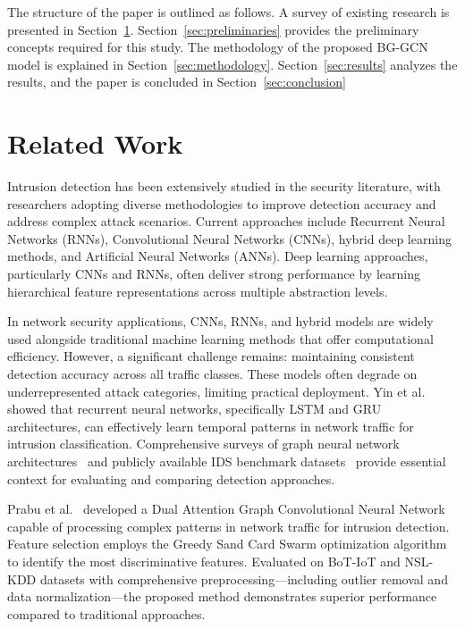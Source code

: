 \documentclass[a4paper,fleqn]{cas-sc}
\begin{document}
The structure of the paper is outlined as follows. A survey of existing research is presented in  Section~\ref{sec2}. Section~\ref{sec:preliminaries} provides the preliminary concepts required for this study. The methodology of the proposed BG-GCN model is explained in Section~\ref{sec:methodology}. Section~\ref{sec:results}  analyzes the results, and the paper is concluded in  Section~\ref{sec:conclusion} 



\section{Related Work}\label{sec2}


Intrusion detection has been extensively studied in the security literature, with researchers adopting diverse methodologies to improve detection accuracy and address complex attack scenarios. Current approaches include Recurrent Neural Networks (RNNs), Convolutional Neural Networks (CNNs), hybrid deep learning methods, and Artificial Neural Networks (ANNs). Deep learning approaches, particularly CNNs and RNNs, often deliver strong performance by learning hierarchical feature representations across multiple abstraction levels.

In network security applications, CNNs, RNNs, and hybrid models are widely used alongside traditional machine learning methods that offer computational efficiency. However, a significant challenge remains: maintaining consistent detection accuracy across all traffic classes. These models often degrade on underrepresented attack categories, limiting practical deployment. Yin et al.~\cite{bib27} showed that recurrent neural networks, specifically LSTM and GRU architectures, can effectively learn temporal patterns in network traffic for intrusion classification. Comprehensive surveys of graph neural network architectures~\cite{bib26} and publicly available IDS benchmark datasets~\cite{bib30} provide essential context for evaluating and comparing detection approaches.

Prabu et al.~\cite{bib6} developed a Dual Attention Graph Convolutional Neural Network capable of processing complex patterns in network traffic for intrusion detection. Feature selection employs the Greedy Sand Card Swarm optimization algorithm to identify the most discriminative features. Evaluated on BoT-IoT and NSL-KDD datasets with comprehensive preprocessing---including outlier removal and data normalization---the proposed method demonstrates superior performance compared to traditional approaches.
\end{document}
